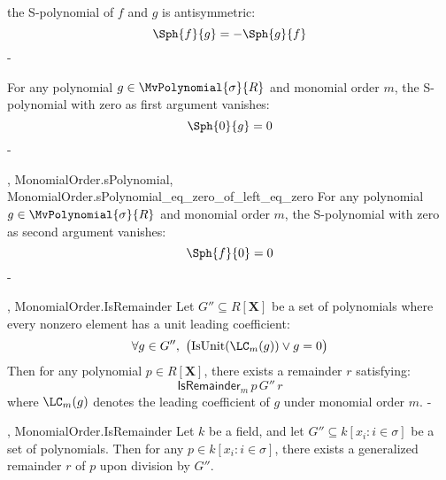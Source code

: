 \begin{lemma}\label{MonomialOrder.sPolynomial_antisymm}
  \leanok
  the S-polynomial of $f$ and $g$ is antisymmetric:
\[
\Sph{f}{g} = -\Sph{g}{f}
\]
-
\end{lemma}

\begin{lemma}\label{MonomialOrder.sPolynomial_eq_zero_of_left_eq_zero}
  \leanok
  For any polynomial $g \in \MvPolynomial{\sigma}{R}$ and monomial order $m$,
the S-polynomial with zero as first argument vanishes:
\[
\Sph{0}{g} = 0
\]
-
\end{lemma}

\begin{lemma}\label{MonomialOrder.sPolynomial_eq_zero_of_right_eq_zero'}
  \leanok
  ,
{MonomialOrder.sPolynomial},
{MonomialOrder.sPolynomial_eq_zero_of_left_eq_zero}
  For any polynomial $g \in \MvPolynomial{\sigma}{R}$ and monomial order $m$,
the S-polynomial with zero as second argument vanishes:
\[
\Sph{f}{0} = 0
\]
-
\end{lemma}

\begin{lemma}\label{MonomialOrder.div_set'}
  \leanok
  ,
{MonomialOrder.IsRemainder}
  Let $G'' \subseteq R[\mathbf{X}]$ be a set of polynomials where every nonzero element has a unit leading coefficient:
\[
\forall g \in G'',\ \big(\mathrm{IsUnit}(\LC_m(g)) \lor g = 0\big)
\]
Then for any polynomial $p \in R[\mathbf{X}]$, there exists a remainder $r$ satisfying:
\[
\mathsf{IsRemainder}_m\,p\,G''\,r
\]
where $\LC_m(g)$ denotes the leading coefficient of $g$ under monomial order $m$.
-
\end{lemma}

\begin{lemma}\label{MonomialOrder.div_set''}
  \leanok
  ,
{MonomialOrder.IsRemainder}
  Let \( k \) be a field, and let \( G'' \subseteq k[x_i : i \in \sigma] \) be a set of polynomials.
Then for any \( p \in k[x_i : i \in \sigma] \), there exists a generalized remainder \( r \) of \( p \) upon division by \( G'' \).

\end{lemma}

